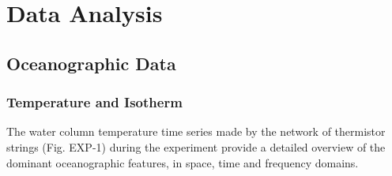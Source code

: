 
\chapter{Data Analysis}

\section{Oceanographic Data}
\subsection{Temperature and Isotherm}
The water column temperature time series made by the network of
thermistor strings (Fig. EXP-1) during  the experiment provide a
detailed overview of the dominant oceanographic features, in space,
time and frequency domains.

